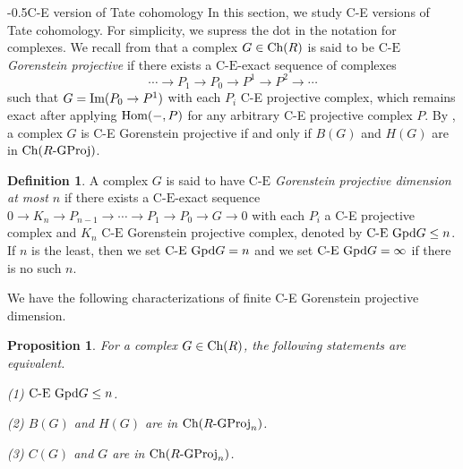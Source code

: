 \documentclass[reqno,12pt]{amsart}
\makeatletter
\numberwithin{equation}{section}
\def\Im{\mbox{\rm Im}} \def\id{\mbox{\rm id}} \def\wid{\mbox{\rm w{\text -}id}} \def\FPid{\mbox{\rm FP{\text -}id}}
\def\Ch{\mbox{\rm Ch}}
\theoremstyle{plain}
\newtheorem{proposition}[theorem]{\bf Proposition}
\theoremstyle{definition}
\newtheorem{definition}[theorem]{\bf Definition}
\newcommand{\CE}{\mathrm{C}\text{-}\mathrm{E}}
\renewcommand{\section}{\@startsection{section}{1}{0mm}
  {-\baselineskip}{0.5\baselineskip}{\bf\leftline}}
\makeatother
\begin{document}
\section{C-E version of Tate cohomology}
In this section, we study C-E versions of Tate cohomology. For simplicity, we supress the dot in the notation for complexes. We recall from \cite{E11} that a complex
$G\in\Ch(R)$ is said to be {\it $\CE$ Gorenstein projective} if there exists a $\CE$-exact
sequence of complexes
$$ \cdots\to P_{1}\to P_{0}\to P^1\to P^2\to\cdots$$
such that $G=\Im(P_0\to P^1)$ with each $P_i$ C-E projective complex, which remains exact after applying $\mbox{\rm Hom}(-,P)$ for any arbitrary C-E projective complex $P$.
By \cite[Proposition 2.2]{YL14}, a complex $G$ is C-E Gorenstein projective if and only if $B(G)$ and $H(G)$ are in $\Ch(R\text{-}{\rm GProj})$.

\begin{definition}\cite[Definition 2.12]{YL14}\label{def-3}
    A complex $G$ is said to have {\it $\CE$ Gorenstein projective dimension at most $n$} if there exists a $\CE$-exact sequence $0\to K_n\to P_{n-1}\to \cdots\to P_1\to P_0\to G\to 0$ with each $P_i$ a C-E projective complex and $K_n$ $\CE$ Gorenstein projective complex, denoted by $\text{\rm C-E Gpd}G\leq n$. If $n$ is the least, then we set $\text{\rm C-E Gpd}G=n$ and we set $\text{\rm C-E Gpd}G= \infty$ if there is no such $n$.
\end{definition}
We have the following characterizations of finite C-E Gorenstein projective dimension.

\begin{proposition}\label{prop-3}
    For a complex $G\in\Ch(R)$, the following statements are equivalent.

    {\rm (1)} $\text{\rm C-E Gpd}G\leq n$.

    {\rm (2)} $B(G)$ and $H(G)$ are in $\Ch(R\text{-}{\rm GProj}_n)$.

    {\rm (3)} $C(G)$ and $G$ are in $\Ch(R\text{-}{\rm GProj}_n)$.
\end{proposition}
\end{document}
